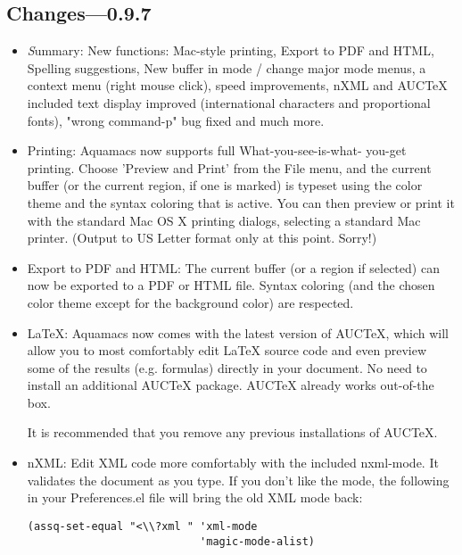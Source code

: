 \subsection{Changes---0.9.7}

\begin{itemize}


\item {\emph Summary:} New functions: Mac-style printing, Export to PDF and
        HTML, Spelling suggestions, New buffer in mode / change major mode
        menus, a context menu (right mouse click), speed improvements,
        nXML and AUCTeX included text display improved (international
        characters and proportional fonts), "wrong command-p" bug fixed
        and much more.


\item Printing: Aquamacs now supports full What-you-see-is-what-
        you-get printing. Choose 'Preview and Print' from the File menu,
        and the current buffer (or the current region, if one is marked)
        is typeset using the color theme and the syntax coloring that is
        active. You can then preview or print it with the standard Mac OS
        X printing dialogs, selecting a standard Mac printer. (Output to
        US Letter format only at this point. Sorry!)

\item Export to PDF and HTML: The current buffer (or a region if
        selected) can now be exported to a PDF or HTML file. Syntax
        coloring (and the chosen color theme except for the background
        color) are respected.

\item LaTeX: Aquamacs now comes with the latest version of
        AUCTeX, which will allow you to most comfortably edit LaTeX source
        code and even preview some of the results (e.g. formulas) directly
        in your document.  No need to install an additional AUCTeX
        package.        AUCTeX already works out-of-the box.

        It is recommended that you remove any previous installations of
        AUCTeX.

\item nXML: Edit XML code more comfortably with the included
        nxml-mode. It validates the document as you type. If you don't
        like the mode, the following in your Preferences.el file will
        bring the old XML mode back:

\begin{verbatim}
(assq-set-equal "<\\?xml " 'xml-mode
                           'magic-mode-alist)
\end{verbatim}


\end{itemize}
